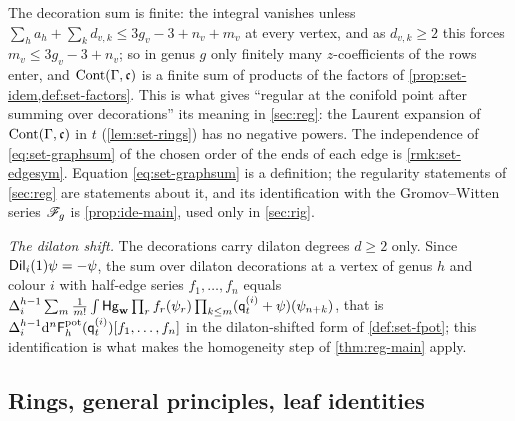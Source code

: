 The decoration sum is finite: the integral vanishes unless $\sum_ha_h+\sum_kd_{v,k}\leq3g_v-3+n_v+m_v$ at every vertex, and as $d_{v,k}\geq2$ this forces $m_v\leq3g_v-3+n_v$; so in genus $g$ only finitely many $z$-coefficients of the rows enter, and $\mathrm{Cont}(\Gamma,\mathfrak{c})$ is a finite sum of products of the factors of \cref{prop:set-idem,def:set-factors}. This is what gives ``regular at the conifold point after summing over decorations'' its meaning in \cref{sec:reg}: the Laurent expansion of $\mathrm{Cont}(\Gamma,\mathfrak{c})$ in $t$ (\cref{lem:set-rings}) has no negative powers. The independence of \eqref{eq:set-graphsum} of the chosen order of the ends of each edge is \cref{rmk:set-edgesym}. Equation \eqref{eq:set-graphsum} is a definition; the regularity statements of \cref{sec:reg} are statements about it, and its identification with the Gromov--Witten series $\mathscr{F}_g$ is \cref{prop:ide-main}, used only in \cref{sec:rig}.

\emph{The dilaton shift.} The decorations carry dilaton degrees $d\geq2$ only. Since $\mathsf{Dil}_i(1)\psi=-\psi$, the sum over dilaton decorations at a vertex of genus $h$ and colour $i$ with half-edge series $f_1,\ldots,f_n$ equals $\Delta_i^{h-1}\sum_m\frac{1}{m!}\int\mathsf{Hg}_{\mathbf{w}}\prod_rf_r(\psi_r)\prod_{k\leq m}(\mathsf{q}_{t}^{(i)}+\psi)(\psi_{n+k})$, that is $\Delta_i^{h-1}\mathrm{d}^n\mathsf{F}^{\mathrm{pot}}_h(\mathsf{q}_{t}^{(i)})[f_1,\ldots,f_n]$ in the dilaton-shifted form of \cref{def:set-fpot}; this identification is what makes the homogeneity step of \cref{thm:reg-main} apply.

\subsection{Rings, general principles, leaf identities}
\label{sec:set-rings}

